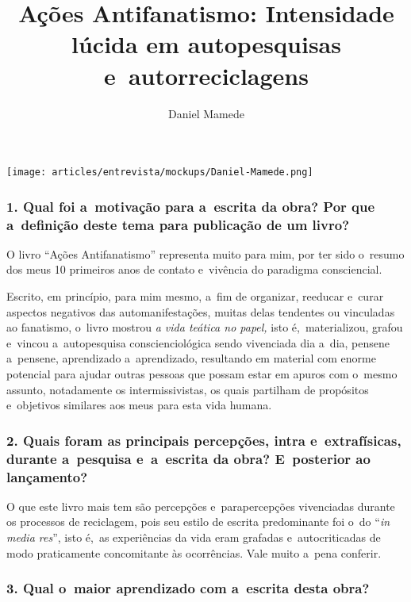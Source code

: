 \documentclass{gescons}
\author{Daniel Mamede}
\title{Ações Antifanatismo: Intensidade lúcida em autopesquisas e~autorreciclagens}
\begin{document}
    \makeentrevistatitle

    \begin{multicols}{2}

\begin{center}
    \texttt{[image: articles/entrevista/mockups/Daniel-Mamede.png]}
\end{center}


\subsubsection{1. Qual foi a~motivação para a~escrita da obra? Por que a~definição deste tema para publicação de um livro?}

O livro “Ações Antifanatismo” representa muito para mim, por ter sido o~resumo dos meus 10 primeiros anos de contato e~vivência do paradigma consciencial. 

Escrito, em princípio, para mim mesmo, a~fim de organizar, reeducar e~curar aspectos negativos das automanifestações, muitas delas tendentes ou vinculadas ao fanatismo, o~livro mostrou \textit{a vida teática no papel,} isto é,~materializou, grafou e~vincou a~autopesquisa conscienciológica sendo vivenciada dia a~dia, pensene a~pensene, aprendizado a~aprendizado, resultando em material com enorme potencial para ajudar outras pessoas que possam estar em apuros com o~mesmo assunto, notadamente os intermissivistas, os quais partilham de propósitos e~objetivos similares aos meus para esta vida humana.



\subsubsection{2. Quais foram as principais percepções, intra e~extrafísicas, durante a~pesquisa e~a~escrita da obra? E~posterior ao lançamento?}

O que este livro mais tem são percepções e~parapercepções vivenciadas durante os processos de reciclagem, pois seu estilo de escrita predominante foi o~do “\textit{in media res}”, isto é,~as experiências da vida eram grafadas e~autocriticadas de modo praticamente concomitante às ocorrências. Vale muito a~pena conferir. 


\subsubsection{3.       Qual o~maior aprendizado com a~escrita desta obra?}


\end{multicols}
\end{document}
